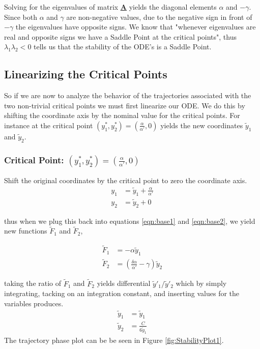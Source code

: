 \documentclass{article}
\def\doubleunderline#1{\underline{\underline{#1}}}
\begin{document}
Solving for the eigenvalues of matrix \doubleunderline{\textbf{A}} yields the diagonal elements $\alpha$ and $-\gamma$. Since both $\alpha$ and $\gamma$ are non-negative values, due to the negative sign in front of $-\gamma$ the eigenvalues have opposite signs. We know that "whenever eigenvalues are real and opposite signs we have a Saddle Point at the critical points", thus $\lambda_1\lambda_2<0$ tells us that the stability of the ODE's is a Saddle Point. 

\subsection{Linearizing the Critical Points}

So if we are now to analyze the behavior of the trajectories associated with the two non-trivial critical points we must first linearize our ODE. We do this by shifting the coordinate axis by the nominal value for the critical points. For instance at the critical point $\left(y_1^*, y_2^*\right)=\left(\frac{\alpha}{\alpha'}, 0\right)$ yields the new coordinates $\tilde{y}_1$ and $\tilde{y}_2$.

\subsubsection{Critical Point: $\left(y_1^*, y_2^*\right)=\left(\frac{\alpha}{\alpha'}, 0\right)$ }
Shift the original coordinates by the critical point to zero the coordinate axis.
\begin{align}
y_1 &= \tilde{y}_1 + \frac{\alpha}{\alpha'}\\
y_2 &= \tilde{y}_2 + 0
\end{align}

thus when we plug this back into equations \eqref{eqn:base1} and \eqref{eqn:base2}, we yield new functions $\tilde{F}_1$ and $\tilde{F}_2$,

\begin{align}
\tilde{F}_1 &= -\alpha \tilde{y}_1\\
\tilde{F}_2 &= \left(\frac{\delta\alpha}{\alpha'}-\gamma \right)\tilde{y}_2
\end{align}

taking the ratio of $\tilde{F}_1$ and $\tilde{F}_2$ yields differential $\tilde{y}'_1/\tilde{y}'_2$ which by simply integrating, tacking on an integration constant, and inserting values for the variables produces.
\begin{align}
\tilde{y}_1 &= \tilde{y}_1 \\
\tilde{y}_2 &= \frac{C}{6 \tilde{y}_1}
\end{align}
The trajectory phase plot can be be seen in Figure \ref{fig:StabilityPlot1}.
\end{document}
